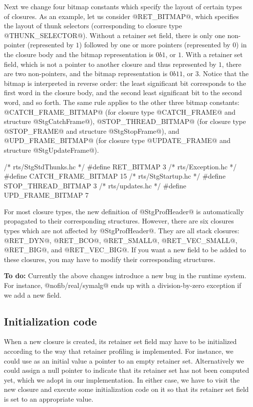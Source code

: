 \documentclass{article}
\begin{document}
Next we change four bitmap constants which specify the layout of
certain types of closures.
As an example, let us consider @RET_BITMAP@, which specifies the layout
of thunk selectors (corresponding to closure type @THUNK_SELECTOR@).
Without a retainer set field, there is only one non-pointer (represented
by $1$) followed by one or more pointers (represented by $0$) in the closure 
body and the bitmap representation is $0b1$, or $1$. 
With a retainer set field, which is not a pointer to another closure and thus
represented by $1$, there are two non-pointers, and the bitmap representation
is $0b11$, or $3$. Notice that the bitmap is interpreted in reverse order:
the least significant bit corresponds to the first word in the closure body,
and the second least significant bit to the second word, and so forth.
The same rule applies to the other three bitmap constants:
@CATCH_FRAME_BITMAP@ (for closure type @CATCH_FRAME@ and structure 
@StgCatchFrame@),
@STOP_THREAD_BITMAP@ (for closure type @STOP_FRAME@ and structure 
@StgStopFrame@), and
@UPD_FRAME_BITMAP@ (for closure type @UPDATE_FRAME@ and structure
@StgUpdateFrame@).

\begin{code}
/* rts/StgStdThunks.hc */
#define RET_BITMAP          3
/* rts/Exception.hc */
#define CATCH_FRAME_BITMAP  15
/* rts/StgStartup.hc */
#define STOP_THREAD_BITMAP  3
/* rts/updates.hc */
#define UPD_FRAME_BITMAP    7
\end{code}

For most closure types, the new definition of @StgProfHeader@ is
automatically propagated to their corresponding structures.
However, there are six closures types which are not affected by 
@StgProfHeader@. They are all stack closures:
@RET_DYN@, @RET_BCO@, @RET_SMALL@, @RET_VEC_SMALL@, @RET_BIG@, and
@RET_VEC_BIG@. 
If you want a new field to be added to these closures, you may
have to modify their corresponding structures.

\textbf{To do:} Currently the above changes introduce a new bug in the 
runtime system. For instance, @nofib/real/symalg@ ends up with a division-by-zero
exception if we add a new field. 

\subsection{Initialization code}

When a new closure is created, its retainer set field may have to be 
initialized according to the way that retainer profiling is implemented.
For instance, we could use as an initial value a pointer to an empty retainer 
set. 
Alternatively we could assign a null pointer to indicate that its retainer
set has not been computed yet, which we adopt in our implementation.
In either case, we have to visit the new closure and execute some initialization
code on it so that its retainer set field is set to an appropriate value.
\end{document}
